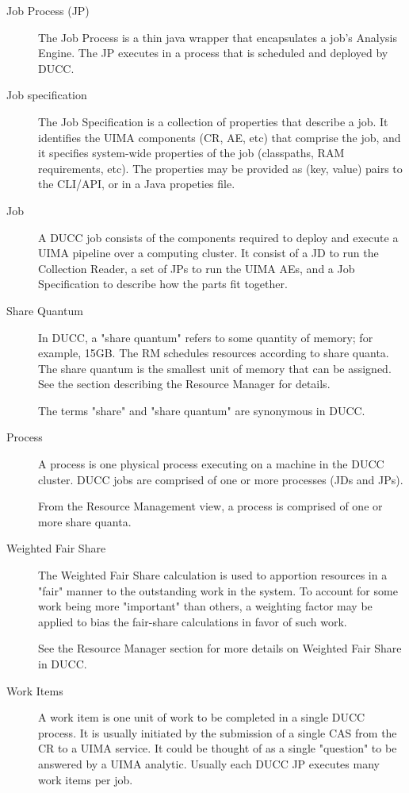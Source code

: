 \begin{description}
\item[Job Process (JP) ]The Job Process is a thin java wrapper that encapsulates a job's Analysis
  Engine. The JP executes in a process that is scheduled and deployed by DUCC.

\item[Job specification ]The Job Specification is a collection of properties that describe a job. It
  identifies the UIMA components (CR, AE, etc) that comprise the job, and it specifies system-wide
  properties of the job (classpaths, RAM requirements, etc). The properties may be provided as (key,
  value) pairs to the CLI/API, or in a Java propeties file.

\item[Job ] A DUCC job consists of the components required to deploy and execute a UIMA pipeline over
  a computing cluster. It consist of a JD to run the Collection Reader, a set of JPs to run the UIMA
  AEs, and a Job Specification to describe how the parts fit together.

\item[Share Quantum ] In DUCC, a "share quantum" refers to some quantity of memory; for example,
  15GB. The RM schedules resources according to share quanta. The share quantum is the smallest unit
  of memory that can be assigned. See the section describing the Resource Manager for details.

  The terms "share" and "share quantum" are synonymous in DUCC. 

\item[Process ]A process is one physical process executing on a machine in the DUCC cluster. DUCC
  jobs are comprised of one or more processes (JDs and JPs).

  From the Resource Management view, a process is comprised of one or more share quanta. 

\item[Weighted Fair Share ] The Weighted Fair Share calculation is used to apportion resources in a
  "fair" manner to the outstanding work in the system. To account for some work being more
  "important" than others, a weighting factor may be applied to bias the fair-share calculations in
  favor of such work.

  See the Resource Manager section for more details on Weighted Fair Share in DUCC. 

\item[Work Items ] A work item is one unit of work to be completed in a single DUCC process. It is
  usually initiated by the submission of a single CAS from the CR to a UIMA service. It could be
  thought of as a single "question" to be answered by a UIMA analytic. Usually each DUCC JP executes
  many work items per job.
\end{description}

